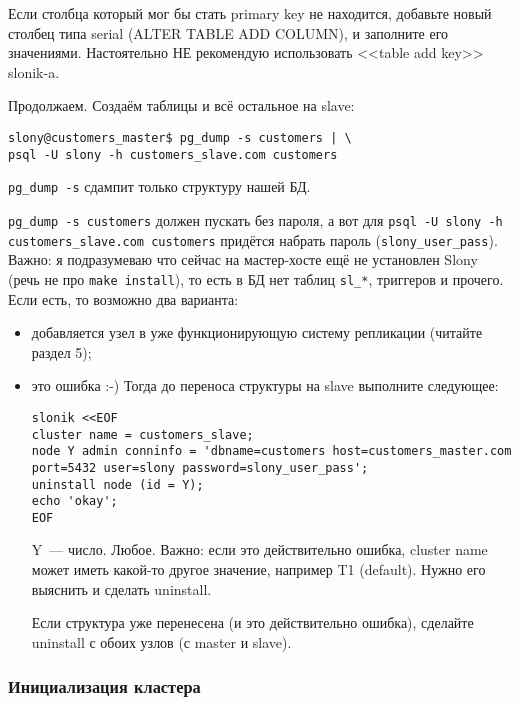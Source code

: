 Если столбца который мог бы стать primary key не находится, добавьте новый столбец типа serial (ALTER TABLE ADD COLUMN), и заполните его значениями. Настоятельно НЕ рекомендую использовать <<table add key>> slonik-a.

Продолжаем. Создаём таблицы и всё остальное на slave:

\begin{lstlisting}[label=lst:slony7,caption=Инициализация БД и plpgsql на slave]
slony@customers_master$ pg_dump -s customers | \
psql -U slony -h customers_slave.com customers
\end{lstlisting}

\lstinline!pg_dump -s! сдампит только структуру нашей БД.

\lstinline!pg_dump -s customers! должен пускать без пароля, а вот для \lstinline!psql -U slony -h customers_slave.com customers! придётся набрать пароль (\lstinline!slony_user_pass!). Важно: я подразумеваю что сейчас на мастер-хосте ещё не установлен Slony (речь не про \lstinline!make install!), то есть в БД нет таблиц \lstinline!sl_*!, триггеров и прочего. Если есть, то возможно два варианта:

\begin{itemize}
  \item добавляется узел в уже функционирующую систему репликации (читайте раздел 5);
  \item это ошибка :-) Тогда до переноса структуры на slave выполните следующее:

\begin{lstlisting}[label=lst:slony8,caption=Инициализация БД и plpgsql на slave]
slonik <<EOF
cluster name = customers_slave;
node Y admin conninfo = 'dbname=customers host=customers_master.com
port=5432 user=slony password=slony_user_pass';
uninstall node (id = Y);
echo 'okay';
EOF
\end{lstlisting}

Y~--- число. Любое. Важно: если это действительно ошибка, cluster name может иметь какой-то другое значение, например T1 (default). Нужно его выяснить и сделать uninstall.

Если структура уже перенесена (и это действительно ошибка), сделайте uninstall с обоих узлов (с master и slave).
\end{itemize}

\subsubsection{Инициализация кластера}

